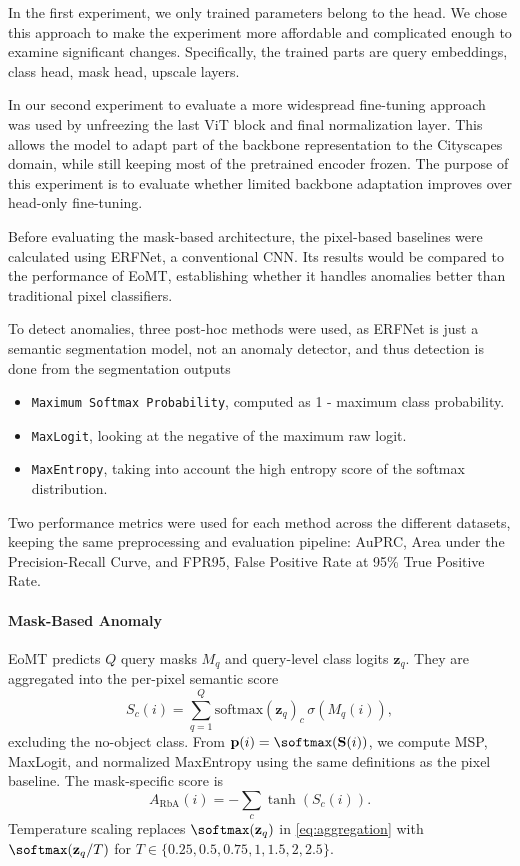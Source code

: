 \documentclass[10pt,twocolumn,letterpaper]{article}
\begin{document}
In the first experiment, we only trained parameters belong to the head. We chose this approach to make the experiment more affordable and complicated enough to examine significant changes. Specifically, the trained parts are query embeddings, class head, mask head, upscale layers. 

In our second experiment to evaluate a more widespread fine-tuning approach was used by unfreezing the last ViT block and final normalization layer. This allows the model to adapt part of the backbone representation to the Cityscapes domain, while still keeping most of the pretrained encoder frozen. The purpose of this experiment is to evaluate whether limited backbone adaptation improves over head-only fine-tuning.

Before evaluating the mask-based architecture, the pixel-based baselines were calculated using ERFNet, a conventional CNN. Its results would be compared to the performance of EoMT, establishing whether it handles anomalies better than traditional pixel classifiers.

To detect anomalies, three post-hoc methods were used, as ERFNet is just a semantic segmentation model, not an anomaly detector, and thus detection is done from the segmentation outputs

\begin{itemize}
    \item \texttt{Maximum Softmax Probability}, computed as 1 - maximum class probability.
    \item \texttt{MaxLogit}, looking at the negative of the maximum raw logit.
    \item \texttt{MaxEntropy}, taking into account the high entropy score of the softmax distribution.
\end{itemize}

Two performance metrics were used for each method across the different datasets, keeping the same preprocessing and evaluation pipeline: AuPRC, Area under the Precision-Recall Curve, and FPR95, False Positive Rate at 95\% True Positive Rate.

\paragraph{Mask-Based Anomaly}EoMT predicts $Q$ query masks $M_q$ and query-level class logits $\mathbf{z}_q$.
They are aggregated into the per-pixel semantic score
\begin{equation}
S_c(i)=\sum_{q=1}^{Q}
    \text{softmax}(\mathbf{z}_q)_c\,\sigma(M_q(i)),
\label{eq:aggregation}
\end{equation}
excluding the no-object class. From $\mathbf{p}(i)=\softmax(\mathbf{S}(i))$, we
compute MSP, MaxLogit, and normalized MaxEntropy using the same definitions as the
pixel baseline. The mask-specific score is
\begin{equation}
    A_{\mathrm{RbA}}(i)=-\sum_c\tanh(S_c(i)).
\label{eq:aggregation}
\end{equation}
Temperature scaling replaces
$\softmax(\mathbf{z}_q)$ in \cref{eq:aggregation} with
$\softmax(\mathbf{z}_q/T)$ for
$T\in\{0.25,0.5,0.75,1,1.5,2,2.5\}$.
\end{document}
